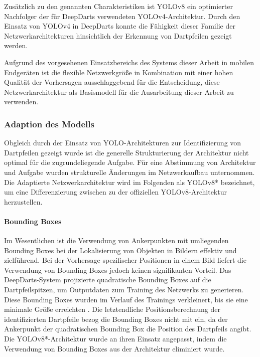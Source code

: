 Zusätzlich zu den genannten Charakteristiken ist YOLOv8 ein optimierter Nachfolger der für DeepDarts verwendeten YOLOv4-Architektur. Durch den Einsatz von YOLOv4 in DeepDarts konnte die Fähigkeit dieser Familie der Netzwerkarchitekturen hinsichtlich der Erkennung von Dartpfeilen gezeigt werden.

Aufgrund des vorgesehenen Einsatzbereichs des Systems dieser Arbeit in mobilen Endgeräten ist die flexible Netzwerkgröße in Kombination mit einer hohen Qualität der Vorhersagen ausschlaggebend für die Entscheidung, diese Netzwerkarchitektur als Basismodell für die Ausarbeitung dieser Arbeit zu verwenden.

\subsubsection{Adaption des Modells}
\label{sec:yolo_adaption}

Obgleich durch \citeauthor{deepdarts} der Einsatz von YOLO-Architekturen zur Identifizierung von Dartpfeilen gezeigt wurde ist die generelle Strukturierung der Architektur nicht optimal für die zugrundeliegende Aufgabe. Für eine Abstimmung von Architektur und Aufgabe wurden strukturelle Änderungen im Netzwerkaufbau unternommen. Die Adaptierte Netzwerkarchitektur wird im Folgenden als YOLOv8* bezeichnet, um eine Differenzierung zwischen zu der offiziellen YOLOv8-Architektur herzustellen.

\paragraph{Bounding Boxes}

Im Wesentlichen ist die Verwendung von Ankerpunkten mit umliegenden Bounding Boxes bei der Lokalisierung von Objekten in Bildern effektiv und zielführend. Bei der Vorhersage spezifischer Positionen in einem Bild liefert die Verwendung von Bounding Boxes jedoch keinen signifikanten Vorteil. Das DeepDarts-System projizierte quadratische Bounding Boxes auf die Dartpfeilspitzen, um Outputdaten zum Training des Netzwerks zu generieren. Diese Bounding Boxes wurden im Verlauf des Trainings verkleinert, bis sie eine minimale Größe erreichten \cite{deepdarts}. Die letztendliche Positionsberechnung der identifizierten Dartpfeile bezog die Bounding Boxes nicht mit ein, da der Ankerpunkt der quadratischen Bounding Box die Position des Dartpfeils angibt. Die YOLOv8*-Architektur wurde an ihren Einsatz angepasst, indem die Verwendung von Bounding Boxes aus der Architektur eliminiert wurde.

